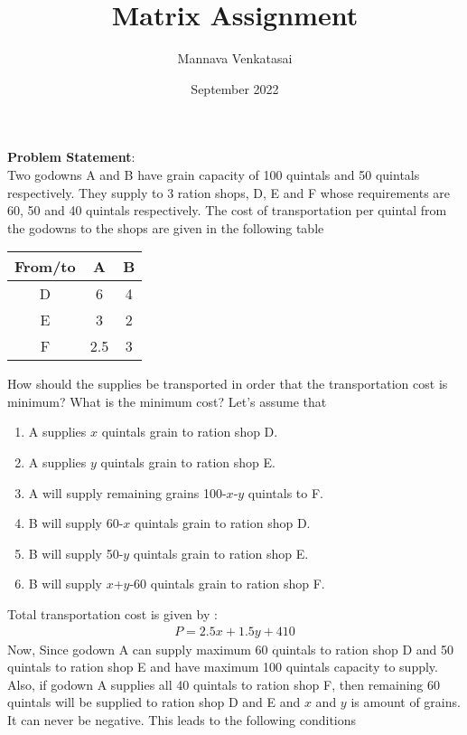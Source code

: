 \documentclass[journal,10pt,twocolumn]{article}
\title{\textbf{Matrix Assignment}}
\author{Mannava Venkatasai}
\date{September 2022}
\begin{document}
\maketitle
\raggedright \textbf{Problem Statement}: \vspace{3mm} \\
Two godowns A and B have grain capacity of 100 quintals and 50 quintals
respectively. They supply to 3 ration shops, D, E and F whose requirements are
60, 50 and 40 quintals respectively. The cost of transportation per quintal from
the godowns to the shops are given in the following table
\begin{table}[!ht]
	\centering
\begin{tabular}{|c|c|c|}
\hline
 From/to & A& B  \\ 
 \hline
 D & 6 & 4 \\  
 \hline
 E & 3  & 2 \\
 \hline
  F & 2.5 & 3 \\
 \hline
\end{tabular} 
\end{table} 
\vspace{5mm}
How should the supplies be transported in order that the transportation cost is minimum? What is the minimum cost?
\fi
Let's assume that 
\begin{enumerate}
\item A supplies $x$ quintals grain to ration shop D.
\item A supplies $y$ quintals grain to ration shop E.
\item A will supply remaining grains 100-$x$-$y$ quintals to F.
\item B will supply 60-$x$ quintals grain to ration shop D. 
\item B will supply 50-$y$ quintals grain to ration shop E.
\item B will supply $x$+$y$-60 quintals grain to ration shop F.
\end{enumerate}
Total transportation cost is given by :
\begin{align}
P=2.5x+1.5y+410
\end{align}
Now, Since godown A can supply maximum 60 quintals to ration shop D and 50 quintals to ration shop E and have maximum 100 quintals capacity to supply.\vspace{2mm} \\ Also, if godown A supplies all 40 quintals to ration shop F, then remaining 60 quintals will be supplied to ration shop D and E and $x$ and $y$ is amount of grains. It can never be negative.  This leads to the following conditions
\end{document}

